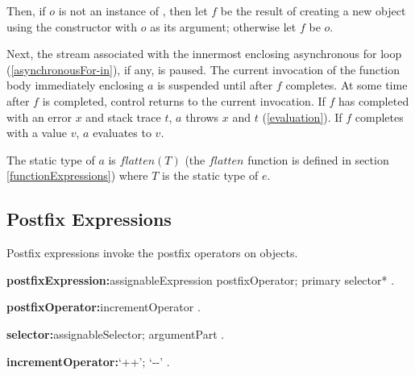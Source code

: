 \documentclass{article}
\begin{document}
\LMHash{}
Then, if $o$ is not an instance of , then let $f$ be the result of creating a new object using the constructor  with $o$ as its argument; otherwise let $f$ be $o$.

\LMHash{}
Next, the stream associated with the innermost enclosing asynchronous for loop (\ref{asynchronousFor-in}), if any, is paused.
The current invocation of the function body immediately enclosing $a$ is suspended until after $f$ completes.
At some time after $f$ is completed, control returns to the current invocation.
If $f$ has completed with an error $x$ and stack trace $t$, $a$ throws $x$ and $t$ (\ref{evaluation}).
If $f$ completes with a value $v$, $a$ evaluates to $v$.





\LMHash{}
The static type of $a$ is $flatten(T)$ (the $flatten$ function is defined in section \ref{functionExpressions}) where $T$ is the static type of $e$.


\subsection{Postfix Expressions}

\LMHash{}
Postfix expressions invoke the postfix operators on objects.

\begin{grammar}
{\bf postfixExpression:}assignableExpression postfixOperator;
  primary selector*
  .

{\bf postfixOperator:}incrementOperator
  .

{\bf selector:}assignableSelector;
  argumentPart
  .

{\bf incrementOperator:}`++';
  `-{}-'
  .
\end{grammar}
\end{document}
